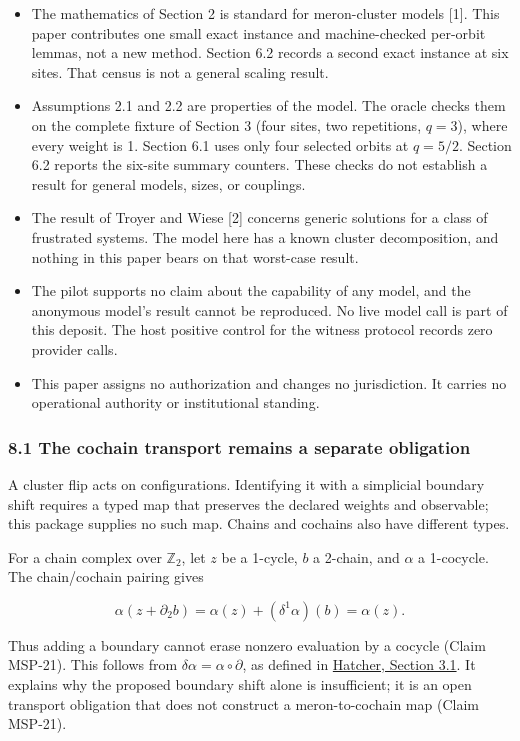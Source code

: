 \documentclass[
  11pt,
]{article}
\providecommand{\tightlist}{%
  \setlength{\itemsep}{0pt}\setlength{\parskip}{0pt}}
\begin{document}
\begin{itemize}
\tightlist
\item
  The mathematics of Section 2 is standard for meron-cluster models
  {[}1{]}. This paper contributes one small exact instance and
  machine-checked per-orbit lemmas, not a new method. Section 6.2
  records a second exact instance at six sites. That census is not a
  general scaling result.
\item
  Assumptions 2.1 and 2.2 are properties of the model. The oracle checks
  them on the complete fixture of Section 3 (four sites, two
  repetitions, \(q = 3\)), where every weight is 1. Section 6.1 uses
  only four selected orbits at \(q = 5/2\). Section 6.2 reports the
  six-site summary counters. These checks do not establish a result for
  general models, sizes, or couplings.
\item
  The result of Troyer and Wiese {[}2{]} concerns generic solutions for
  a class of frustrated systems. The model here has a known cluster
  decomposition, and nothing in this paper bears on that worst-case
  result.
\item
  The pilot supports no claim about the capability of any model, and the
  anonymous model's result cannot be reproduced. No live model call is
  part of this deposit. The host positive control for the witness
  protocol records zero provider calls.
\item
  This paper assigns no authorization and changes no jurisdiction. It
  carries no operational authority or institutional standing.
\end{itemize}

\subsubsection{8.1 The cochain transport remains a separate
obligation}\label{the-cochain-transport-remains-a-separate-obligation}

A cluster flip acts on configurations. Identifying it with a simplicial
boundary shift requires a typed map that preserves the declared weights
and observable; this package supplies no such map. Chains and cochains
also have different types.

For a chain complex over \(\mathbb{Z}_2\), let \(z\) be a 1-cycle, \(b\)
a 2-chain, and \(\alpha\) a 1-cocycle. The chain/cochain pairing gives

\[\alpha(z+\partial_2 b)
 = \alpha(z)+(\delta^1\alpha)(b)
 = \alpha(z).\]

Thus adding a boundary cannot erase nonzero evaluation by a cocycle
(Claim MSP-21). This follows from \(\delta\alpha=\alpha\circ\partial\),
as defined in
\href{https://pi.math.cornell.edu/~hatcher/AT/AT.pdf\#page=199}{Hatcher,
Section 3.1}. It explains why the proposed boundary shift alone is
insufficient; it is an open transport obligation that does not construct
a meron-to-cochain map (Claim MSP-21).
\end{document}
